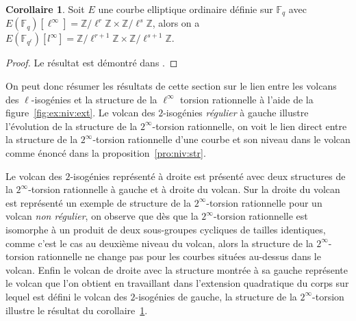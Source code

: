 \documentclass[10pt,a4paper]{book}
\theoremstyle{plain}
\theoremstyle{definition}
\theoremstyle{definition}
\theoremstyle{definition}
\newtheorem{cor}[thm]{Corollaire}
\theoremstyle{definition}
\theoremstyle{definition}
\theoremstyle{remark}
\theoremstyle{remark}
\theoremstyle{definition}
\begin{document}
\begin{cor} 
\label{cor:struct:ext}
Soit $E$ une courbe elliptique ordinaire définie sur $\mathbb{F}_q$ avec $E(\mathbb{F}_{q})[\ell^{\infty}]=\mathbb{Z} / \ell^{r} \mathbb{Z} \times \mathbb{Z} / \ell^{s} \mathbb{Z}$, alors on a $E(\mathbb{F}_{q^{\ell}})[l^{\infty}]=\mathbb{Z} / \ell^{r+1} \mathbb{Z} \times \mathbb{Z} / \ell^{s+1} \mathbb{Z}$.
\end{cor}

\begin{proof}
Le résultat est démontré dans \cite[§5.3.1]{Ionica2010}.
\end{proof}

On peut donc résumer les résultats de cette section sur le lien entre les 
volcans des $\ell$-isogénies et la structure de la $\ell^{\infty}$ torsion 
rationnelle à l'aide de la figure~\ref{fig:ex:niv:ext}. Le volcan des 
$2$-isogénies \emph{régulier} à gauche illustre l'évolution de la structure de
la $2^{\infty}$-torsion rationnelle, on voit le lien direct entre la 
structure de la $2^{\infty}$-torsion rationnelle d'une courbe et son niveau 
dans le volcan comme énoncé dans la proposition~\ref{pro:niv:str}. 

Le volcan des $2$-isogénies représenté à droite est présenté avec deux
structures de la $2^{\infty}$-torsion rationnelle à gauche et à droite du 
volcan. Sur la droite du volcan est représenté un exemple de structure de la 
$2^{\infty}$-torsion rationnelle pour un volcan \emph{non régulier}, on observe
que dès que la $2^{\infty}$-torsion rationnelle est isomorphe à un produit de 
deux sous-groupes cycliques de tailles identiques, comme c'est le cas au 
deuxième niveau du volcan, alors la structure de la $2^{\infty}$-torsion 
rationnelle ne change pas pour les courbes situées au-dessus dans le volcan. 
Enfin le volcan de droite avec la structure montrée à sa gauche représente le 
volcan que l'on obtient en travaillant dans l'extension quadratique du corps 
sur lequel est défini le volcan des $2$-isogénies de gauche, la structure de 
la $2^{\infty}$-torsion illustre le résultat du corollaire~\ref{cor:struct:ext}.
\end{document}
